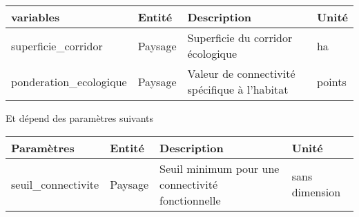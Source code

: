 \documentclass[
]{article}
\begin{document}
\begin{longtable}[]{@{}
  >{\raggedright\arraybackslash}p{}
  >{\raggedright\arraybackslash}p{}
  >{\raggedright\arraybackslash}p{}
  >{\raggedright\arraybackslash}p{}@{}}
\toprule\noalign{}
\begin{minipage}[b]{\linewidth}\raggedright
\textbf{variables}
\end{minipage} & \begin{minipage}[b]{\linewidth}\raggedright
\textbf{Entité}
\end{minipage} & \begin{minipage}[b]{\linewidth}\raggedright
\textbf{Description}
\end{minipage} & \begin{minipage}[b]{\linewidth}\raggedright
\textbf{Unité}
\end{minipage} \\
\midrule\noalign{}
\endhead
\bottomrule\noalign{}
\endlastfoot
superficie\_corridor & Paysage & Superficie du corridor écologique &
ha \\
ponderation\_ecologique & Paysage & Valeur de connectivité spécifique à
l'habitat & points \\
\end{longtable}

Et dépend des paramètres suivants

\begin{longtable}[]{@{}
  >{\raggedright\arraybackslash}p{}
  >{\raggedright\arraybackslash}p{}
  >{\raggedright\arraybackslash}p{}
  >{\raggedright\arraybackslash}p{}@{}}
\toprule\noalign{}
\begin{minipage}[b]{\linewidth}\raggedright
\textbf{Paramètres}
\end{minipage} & \begin{minipage}[b]{\linewidth}\raggedright
\textbf{Entité}
\end{minipage} & \begin{minipage}[b]{\linewidth}\raggedright
\textbf{Description}
\end{minipage} & \begin{minipage}[b]{\linewidth}\raggedright
\textbf{Unité}
\end{minipage} \\
\midrule\noalign{}
\endhead
\bottomrule\noalign{}
\endlastfoot
seuil\_connectivite & Paysage & Seuil minimum pour une connectivité
fonctionnelle & sans dimension \\
\end{longtable}
\end{document}
